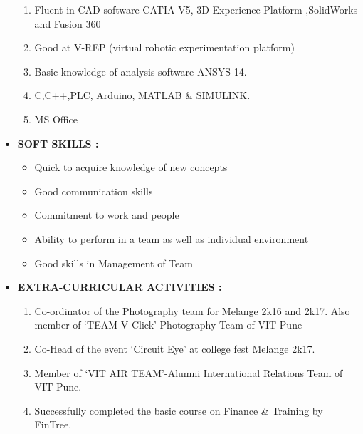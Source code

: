 \documentclass[11pt]{article}
\begin{document}
\begin{itemize}[label=$\star$]
		\begin{enumerate}
			\itemsep0em
			\item Fluent in CAD software CATIA V5, 3D-Experience Platform ,SolidWorks and Fusion 360 
			\item Good at V-REP (virtual robotic experimentation platform)
			\item Basic knowledge of analysis software ANSYS 14.
			\item C,C++,PLC, Arduino, MATLAB \& SIMULINK.
			\item MS Office
		\end{enumerate}
		\bigskip
		\item	\begin{large} \textbf{SOFT SKILLS :} \end{large}
		\begin{itemize}[label=$\bullet$]
			\item Quick to acquire knowledge of new concepts
			\item Good communication skills
			\item Commitment to work and people
			\item Ability to perform in a team as well as individual environment
			\item Good skills in Management of Team
		\end{itemize}
		\bigskip
		\item	\begin{large} \textbf{EXTRA-CURRICULAR ACTIVITIES :} \end{large}
		\begin{enumerate}
			\item Co-ordinator of the Photography team for Melange 2k16 and 2k17. Also member of `TEAM V-Click'-Photography Team of VIT Pune
			\item Co-Head of the event `Circuit Eye' at college fest Melange 2k17. 
			\item Member of `VIT AIR TEAM'-Alumni International Relations Team of VIT Pune.
			\item Successfully completed the basic course on Finance \& Training by FinTree.
		\end{enumerate}

\end{itemize}
\end{document}
